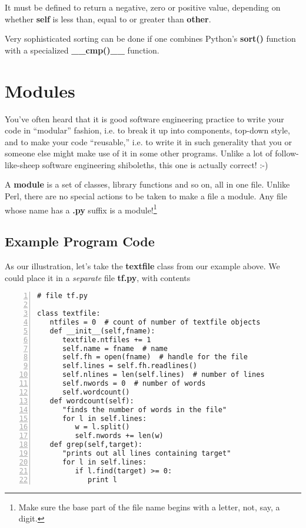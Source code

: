 It must be defined to return a negative, zero or positive value,
depending on whether {\bf self} is less than, equal to or greater than
{\bf other}.

Very sophisticated sorting can be done if one combines Python's {\bf
sort()} function with a specialized {\bf \_\_cmp()\_\_} function.

\section{Modules }

You've often heard that it is good software engineering practice to
write your code in ``modular'' fashion, i.e. to break it up into
components, top-down style, and to make your code ``reusable,'' i.e. to
write it in such generality that you or someone else might make use of
it in some other programs.  Unlike a lot of follow-like-sheep software
engineering shiboleths, this one is actually correct! :-)

A {\bf module} is a set of classes, library functions and so on, all in
one file.  Unlike Perl, there are no special actions to be taken to make
a file a module.  Any file whose name has a {\bf .py} suffix is a
module!\footnote{Make sure the base part of the file name begins with a
letter, not, say, a digit.}

\subsection{Example Program Code}
\label{tfmodexample}

As our illustration, let's take the {\bf textfile} class from our
example above.  We could place it in a {\it separate} file {\bf tf.py},
with contents

\begin{samepage}
\begin{Verbatim}[fontsize=\relsize{-2},numbers=left]
# file tf.py

class textfile:
   ntfiles = 0  # count of number of textfile objects
   def __init__(self,fname):
      textfile.ntfiles += 1
      self.name = fname  # name 
      self.fh = open(fname)  # handle for the file
      self.lines = self.fh.readlines()
      self.nlines = len(self.lines)  # number of lines 
      self.nwords = 0  # number of words
      self.wordcount()
   def wordcount(self):
      "finds the number of words in the file"
      for l in self.lines:
         w = l.split()
         self.nwords += len(w)
   def grep(self,target):
      "prints out all lines containing target"
      for l in self.lines:
         if l.find(target) >= 0:
            print l
\end{Verbatim}
\end{samepage}

